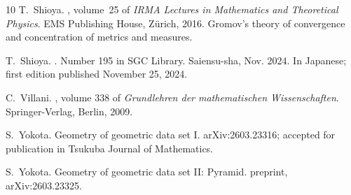 \documentclass[11pt]{amsart}
\theoremstyle{plain}
\theoremstyle{definition}
\theoremstyle{remark}
\begin{document}
\begin{thebibliography}{10}
T.~Shioya.
, volume~25 of {\em IRMA Lectures in
  Mathematics and Theoretical Physics}.
\newblock EMS Publishing House, Z\"urich, 2016.
\newblock Gromov's theory of convergence and concentration of metrics and
  measures.

T.~Shioya.
.
\newblock Number 195 in SGC Library. Saiensu-sha, Nov. 2024.
\newblock In Japanese; first edition published November 25, 2024.

C.~Villani.
, volume 338 of {\em Grundlehren der
  mathematischen Wissenschaften}.
\newblock Springer-Verlag, Berlin, 2009.

S.~Yokota.
\newblock Geometry of geometric data set {I}.
\newblock arXiv:2603.23316; accepted for publication in Tsukuba Journal of
  Mathematics.

S.~Yokota.
\newblock Geometry of geometric data set {II}: {P}yramid.
\newblock preprint, arXiv:2603.23325.

\end{thebibliography}
\end{document}
